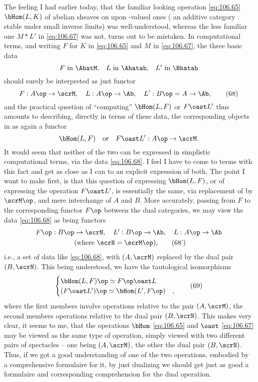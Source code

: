 The feeling I had earlier today, that the familiar looking
operation \eqref{eq:106.65} $\bHom(L,K)$ of abelian sheaves on \Ahat{}
upon \scrM-valued ones (\scrM{} an additive category stable under
small inverse limits) was well-understood, whereas the less familiar
one $M*L'$ in \eqref{eq:106.67} was not, turns out to be mistaken. In
computational terms, and writing $F$ for $K$ in \eqref{eq:106.65} and
$M$ in \eqref{eq:106.67}, the three basic data
\[\text{$F$ in \AhatM,} \quad
\text{$L$ in \Ahatab,} \quad
\text{$L'$ in \Bhatab}\]
should surely be interpreted as just functor
\begin{equation}
  \label{eq:106.68}
  F:A\op\to\scrM, \quad
  L:A\op\to\Ab,\quad
  L':B\op=A\to\Ab,\tag{68}
\end{equation}
and the practical question of ``computing'' $\bHom(L,F)$ or $F\oast
L'$ thus amounts to describing, directly in terms of these data, the
corresponding objects in \AhatM{} as again a functor
\[\bHom(L,F)\quad\text{or}\quad F\oast L':A\op\to\scrM.\]
It would seem that neither of the two can be expressed in simplistic
computational terms, via the data \eqref{eq:106.68}. I feel I have to
come to terms with this fact and get as close as I can to an explicit
expression of both. The point I want to make first, is that this
question of expressing $\bHom(L,F)$, or of expressing the operation
$F\oast L'$, is essentially the same, via replacement of \scrM{} by
$\scrM\op$, and mere interchange of $A$ and $B$. More accurately,
passing from $F$ to the corresponding functor $F\op$ between the dual
categories, we may view the data \eqref{eq:106.68} as being functors
\begin{multline}
  \label{eq:106.68prime}
  F\op:B\op\to\scrN,\quad
  L':B\op\to\Ab,\quad
  L:A\op\to\Ab\\
  \text{ (where $\scrN=\scrM\op$),}\tag{68'}
\end{multline}
i.e., a set of data like \eqref{eq:106.68}, with $(A,\scrM)$ replaced
by the dual pair $(B,\scrN)$. This being understood, we have the
tautological isomorphisms
\begin{equation}
  \label{eq:106.69}
  \begin{cases}
    \bHom(L,F)\op \simeq F\op \oast L & \\
    (F\oast L')\op \simeq \bHom(L',F\op) &\text{,}
  \end{cases}\tag{69}
\end{equation}
where the first members involve operations relative to the pair
$(A,\scrM)$, the second members operations relative to the dual pair
$(B,\scrN)$. This makes very clear, it seems to me, that the
operations $\bHom$ \eqref{eq:106.65} and $\oast$ \eqref{eq:106.67} may
be viewed as the same type of operation, simply viewed with two
different pairs of spectacles -- one being $(A,\scrM)$, the other the
dual pair $(B,\scrN)$. Thus, if we got a good understanding of one of
the two operations, embodied by a comprehensive
formulaire for it, by just
dualizing we should get just as good a formulaire and corresponding
comprehension for the dual operation.

